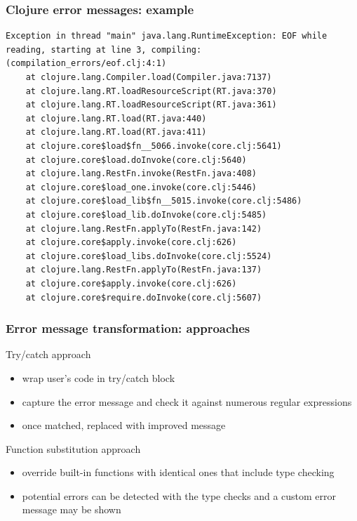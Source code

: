 \documentclass{beamer}
\begin{document}
\begin{frame}[fragile]
\frametitle{Clojure error messages: example}

\begin{verbatim}
Exception in thread "main" java.lang.RuntimeException: EOF while reading, starting at line 3, compiling:(compilation_errors/eof.clj:4:1)
	at clojure.lang.Compiler.load(Compiler.java:7137)
	at clojure.lang.RT.loadResourceScript(RT.java:370)
	at clojure.lang.RT.loadResourceScript(RT.java:361)
	at clojure.lang.RT.load(RT.java:440)
	at clojure.lang.RT.load(RT.java:411)
	at clojure.core$load$fn__5066.invoke(core.clj:5641)
	at clojure.core$load.doInvoke(core.clj:5640)
	at clojure.lang.RestFn.invoke(RestFn.java:408)
	at clojure.core$load_one.invoke(core.clj:5446)
	at clojure.core$load_lib$fn__5015.invoke(core.clj:5486)
	at clojure.core$load_lib.doInvoke(core.clj:5485)
	at clojure.lang.RestFn.applyTo(RestFn.java:142)
	at clojure.core$apply.invoke(core.clj:626)
	at clojure.core$load_libs.doInvoke(core.clj:5524)
	at clojure.lang.RestFn.applyTo(RestFn.java:137)
	at clojure.core$apply.invoke(core.clj:626)
	at clojure.core$require.doInvoke(core.clj:5607)
\end{verbatim}

\end{frame}

\begin{frame}
\frametitle{Error message transformation: approaches}
	Try/catch approach
	\begin{itemize}
  	\item wrap user's code in try/catch block
  	\item capture the error message and check it against numerous regular expressions
  	\item once matched, replaced with improved message
	\end{itemize}
	 
	 Function substitution approach
	 \begin{itemize}
  	 \item override built-in functions with identical ones that include type checking
  	 \item potential errors can be detected with the type checks and a custom error message may be shown
	 \end{itemize}

\end{frame}
\end{document}
